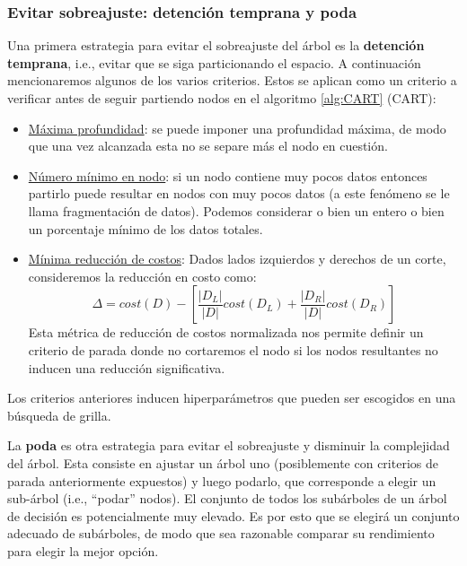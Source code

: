 \subsubsection{Evitar sobreajuste: detención temprana y poda}

Una primera estrategia para evitar el sobreajuste del árbol es la \textbf{detención temprana}, i.e., evitar que se siga particionando el espacio. A continuación mencionaremos algunos de los varios criterios. Estos se aplican como un criterio a verificar antes de seguir partiendo nodos en el algoritmo \ref{alg:CART} (CART):

\begin{itemize}
    \item \underline{Máxima profundidad}:
    se puede imponer una profundidad máxima, de modo que una vez alcanzada esta no se separe más el nodo en cuestión.

    \item \underline{Número mínimo en nodo}: si un nodo contiene muy pocos datos entonces partirlo puede resultar en nodos con muy pocos datos (a este fenómeno se le llama fragmentación de datos). Podemos considerar o bien un entero o bien un porcentaje mínimo de los datos totales.

    \item \underline{Mínima reducción de costos}: Dados lados izquierdos y derechos de un corte, consideremos la reducción en costo como:
    \begin{equation}
        \Delta = cost(D) - \left[ \frac{|D_L|}{|D|} cost(D_L) + \frac{|D_R|}{|D|} cost(D_R) \right]
    \end{equation}
    Esta métrica de reducción de costos normalizada nos permite definir un criterio de parada donde no cortaremos el nodo si los nodos resultantes no inducen una reducción significativa. 
\end{itemize}

Los criterios anteriores inducen hiperparámetros que pueden ser
escogidos en una búsqueda de grilla.

La \textbf{poda} es otra estrategia para evitar el sobreajuste y disminuir la complejidad del árbol. Esta consiste en ajustar un árbol uno (posiblemente con criterios de parada anteriormente expuestos) y luego podarlo, que corresponde a elegir un sub-árbol (i.e., “podar” nodos). El conjunto de todos los subárboles de un árbol de decisión es potencialmente muy elevado. Es por esto que se elegirá un conjunto adecuado de subárboles, de modo que sea razonable comparar su rendimiento para elegir la mejor opción.

